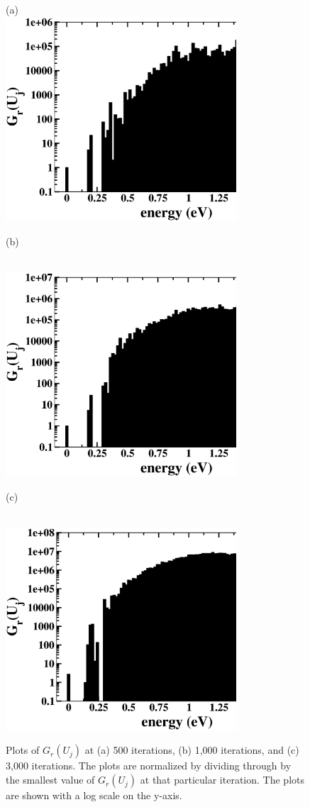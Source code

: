\documentclass[aps,pre,reprint,superscriptaddress,showkeys]{revtex4-1}
\begin{document}
\begin{figure}[h!]
(a)\\
\includegraphics[width=8.6cm]{fig7a.eps}
\centerline{(b)}\\
\includegraphics[width=8.6cm]{fig7b.eps}
\centerline{(c)}\\
\includegraphics[width=8.6cm]{fig7c.eps}
\caption{Plots of $G_r(U_j)$ at (a) 500 iterations, (b) 1,000 iterations, and (c) 3,000 iterations. The plots are normalized by dividing through by the smallest value of $G_r(U_j)$ at that particular iteration. The plots are shown with a log scale on the y-axis.  \label{converge_GE}}
\end{figure}
\end{document}
